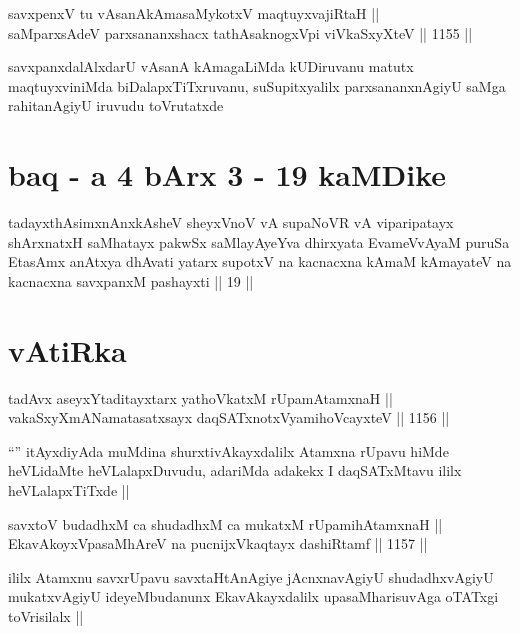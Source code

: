 
\begin{shl}
savxpenxV tu vAsanAkAmasaMykotxV maqtuyxvajiRtaH || \\
saMparxsAdeV parxsananxshacx tathA\s saknogxV\s pi viVkaSxyXteV ||  1155 ||  
\end{shl}

\begin{artha}
savxpanxdalAlxdarU vAsanA kAmagaLiMda kUDiruvanu matutx maqtuyxviniMda biDalapxTiTxruvanu, suSupitxyalilx parxsananxnAgiyU saMga rahitanAgiyU iruvudu toVrutatxde
\end{artha}

\section*{baq - a 4 bArx 3 - 19 kaMDike}

\begin{shl}
tadayxthAsimxnAnxkAsheV sheyxVnoV vA supaNoVR vA viparipatayx shArxnatxH saMhatayx pakwSx saMlayAyeYva dhirxyata EvameVvAyaM puruSa EtasAmx anAtxya dhAvati yatarx supotxV na kacnacxna kAmaM kAmayateV na kacnacxna savxpanxM pashayxti || 19 ||
\end{shl}

\section*{vAtiRka}

\begin{shl}
tadAvx aseyxYtaditayxtarx yathoVkatxM rUpamAtamxnaH || \\
vakaSxyXmANamatasatxsayx daqSATxnotxV\s yamihoVcayxteV ||  1156 ||  
\end{shl}

\begin{artha}
``\stext'' itAyxdiyAda muMdina shurxtivAkayxdalilx Atamxna rUpavu hiMde heVLidaMte heVLalapxDuvudu, adariMda adakekx I daqSATxMtavu ililx heVLalapxTiTxde ||
\end{artha}

\begin{shl}
savxtoV budadhxM ca shudadhxM ca mukatxM rUpamihA\s \s tamxnaH || \\
EkavAkoyxVpasaMhAreV na pucnijxVkaqtayx dashiRtamf ||  1157 ||  
\end{shl}

\begin{artha}
ililx Atamxnu savxrUpavu savxtaHtAnAgiye jAcnxnavAgiyU shudadhxvAgiyU mukatxvAgiyU ideyeMbudanunx EkavAkayxdalilx upasaMharisuvAga oTATxgi toVrisilalx ||
\end{artha}

